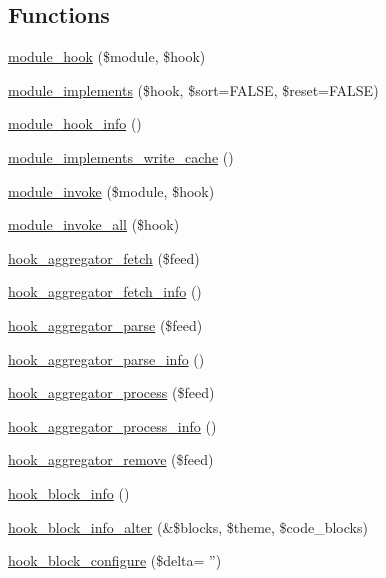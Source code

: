 \subsection*{Functions}
\begin{DoxyCompactItemize}
\item 
\hyperlink{group__hooks_ga0d7a0b03039c561b63424b2a6cf6103f}{module\_\-hook} (\$module, \$hook)
\item 
\hyperlink{group__hooks_ga9191200072f2a641829e9d3c2759561f}{module\_\-implements} (\$hook, \$sort=FALSE, \$reset=FALSE)
\item 
\hyperlink{group__hooks_ga30e72b1391cfa4c282fe98e0dabe02f9}{module\_\-hook\_\-info} ()
\item 
\hyperlink{group__hooks_ga993e46e78bf9dfb0e940c0dcccf5e33d}{module\_\-implements\_\-write\_\-cache} ()
\item 
\hyperlink{group__hooks_ga7547905cff161d057f9e71088ec67f05}{module\_\-invoke} (\$module, \$hook)
\item 
\hyperlink{group__hooks_gabedb5f566ef5faaa5768dd15125b111c}{module\_\-invoke\_\-all} (\$hook)
\item 
\hyperlink{group__hooks_ga459db08cc062e9ea3bf1f526daf91a4a}{hook\_\-aggregator\_\-fetch} (\$feed)
\item 
\hyperlink{group__hooks_gaa9eb0b672b7f66eb5aaccf27e8ff995f}{hook\_\-aggregator\_\-fetch\_\-info} ()
\item 
\hyperlink{group__hooks_gae27163e729bb531cc527ec6f0ad16943}{hook\_\-aggregator\_\-parse} (\$feed)
\item 
\hyperlink{group__hooks_ga4cf79b336cf009dee9487ae9d2249d9d}{hook\_\-aggregator\_\-parse\_\-info} ()
\item 
\hyperlink{group__hooks_gaf5da0f420ab3b27c1bc33f339c979ac7}{hook\_\-aggregator\_\-process} (\$feed)
\item 
\hyperlink{group__hooks_gae616ac385e5ff114031dc2dc88413e32}{hook\_\-aggregator\_\-process\_\-info} ()
\item 
\hyperlink{group__hooks_gaf2f3e401371efb540b050208df5400eb}{hook\_\-aggregator\_\-remove} (\$feed)
\item 
\hyperlink{group__hooks_ga2bd926c3e90deeba0c3ba64fb3c64d73}{hook\_\-block\_\-info} ()
\item 
\hyperlink{group__hooks_ga6a57bda0a2640ccadef4d7c8b6d2a26f}{hook\_\-block\_\-info\_\-alter} (\&\$blocks, \$theme, \$code\_\-blocks)
\item 
\hyperlink{group__hooks_gacc86fefd1e0299f387f79a37dd1a48b7}{hook\_\-block\_\-configure} (\$delta= '')

\end{DoxyCompactItemize}
